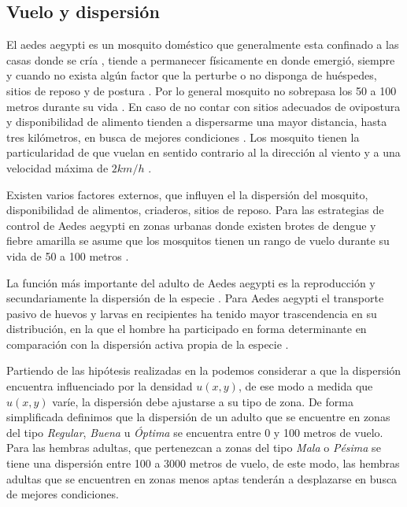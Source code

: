 
\subsection{Vuelo y dispersión}
\label{subsec:cap4-vuelo-dispersion}
El aedes aegypti es un mosquito doméstico que generalmente esta confinado a las casas donde se
cría \cite{luevano1993ciclo}, tiende a permanecer físicamente en donde emergió, siempre y cuando
no exista algún factor que la perturbe o no disponga de huéspedes, sitios de reposo y de postura
\cite{ThironIzcazaJ2003}. Por lo general mosquito no sobrepasa los 50 a 100 metros durante su vida
\cite{cabezas2005dengue}. En caso de no contar con sitios adecuados de ovipostura y disponibilidad
de alimento tienden a dispersarme una mayor distancia, hasta tres kilómetros, en busca de
mejores condiciones \cite{ThironIzcazaJ2003}. Los mosquito tienen la particularidad de que vuelan
en sentido contrario al la dirección al viento \cite{ThironIzcazaJ2003,web-site:speedAnimals} y a
una velocidad máxima de $2 km/h$ \cite{web-site:speedAnimals,kaufmann2004flight}.

Existen varios factores externos, que influyen el la dispersión del mosquito, disponibilidad de
alimentos, criaderos, sitios de reposo. Para las estrategias de control de Aedes aegypti en zonas
urbanas donde existen brotes de dengue y fiebre amarilla se asume que los mosquitos tienen un
rango de vuelo durante su vida de 50 a 100 metros \cite{dengueUruguayCap8}.

La función más importante del adulto de Aedes aegypti es la reproducción y secundariamente la
dispersión de la especie \cite{ThironIzcazaJ2003}. Para Aedes aegypti el transporte pasivo de
huevos y larvas en recipientes ha tenido mayor trascendencia en su distribución, en la que el
hombre ha participado en forma determinante en comparación con la dispersión activa propia de la especie \citep{ThironIzcazaJ2003}.

Partiendo de las hipótesis realizadas en la  podemos considerar a
que la dispersión encuentra influenciado por la densidad $u(x,y)$, de ese modo a medida que
$u(x,y)$ varíe, la dispersión debe ajustarse a su tipo de zona. De forma simplificada definimos que
la dispersión de un adulto que se encuentre en zonas del tipo \textit{Regular}, \textit{Buena} u
\textit{Óptima} se encuentra entre 0 y 100 metros de vuelo. Para las hembras adultas, que
pertenezcan a zonas del tipo \textit{Mala} o \textit{Pésima} se tiene una dispersión entre 100 a
3000 metros de vuelo, de este modo, las hembras adultas que se encuentren en zonas menos aptas
tenderán a desplazarse en busca de mejores condiciones.
